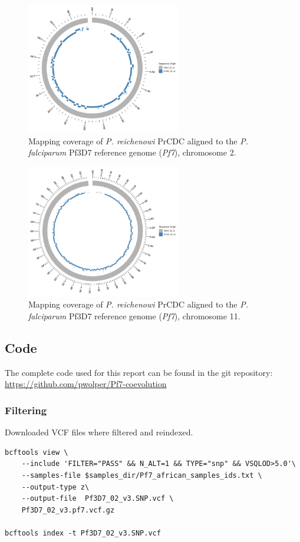 \documentclass[11pt]{article}
\begin{document}
\begin{figure}[htbp]
\centering
\includegraphics[width=0.6\textwidth]{./figures/Pf7_PrCDC_nucmer_chr2.png}
\caption{\label{nucmer_coverage_chr2}Mapping coverage of \emph{P. reichenowi} PrCDC aligned to the  \emph{P. falciparum} Pf3D7 reference genome (\emph{Pf7}), chromosome 2.}
\end{figure}

\begin{figure}[htbp]
\centering
\includegraphics[width=0.6\textwidth]{./figures/Pf7_PrCDC_nucmer_chr11.png}
\caption{\label{nucmer_coverage_chr11}Mapping coverage of \emph{P. reichenowi} PrCDC aligned to the  \emph{P. falciparum} Pf3D7 reference genome (\emph{Pf7}), chromosome 11.}
\end{figure}

\subsection*{Code}
\label{sec:org5518209}
The complete code used for this report can be found in the git repository:\\[0pt]
\url{https://github.com/pwolper/Pf7-coevolution}

\subsubsection*{Filtering}
\label{sec:org30e2d82}
Downloaded VCF files where filtered and reindexed.
\begin{verbatim}
bcftools view \
    --include 'FILTER="PASS" && N_ALT=1 && TYPE="snp" && VSQLOD>5.0'\
    --samples-file $samples_dir/Pf7_african_samples_ids.txt \
    --output-type z\
    --output-file  Pf3D7_02_v3.SNP.vcf \
    Pf3D7_02_v3.pf7.vcf.gz

bcftools index -t Pf3D7_02_v3.SNP.vcf
\end{verbatim}
\end{document}
